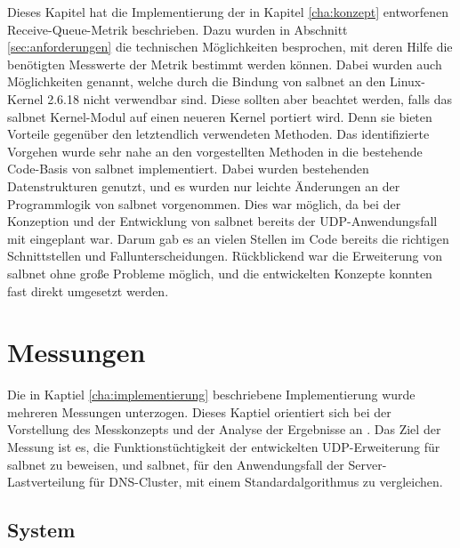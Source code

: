 \documentclass[a4paper, 12pt, BCOR10mm, DIV12, toc=bibliography, toc=listof, german]{scrbook}
\begin{document}
		Dieses Kapitel hat die Implementierung der in Kapitel \ref{cha:konzept} entworfenen Receive-Queue-Metrik
		beschrieben. Dazu wurden in Abschnitt \ref{sec:anforderungen} die technischen Möglichkeiten
		besprochen, mit deren Hilfe die benötigten Messwerte der Metrik bestimmt werden können. Dabei
		wurden auch Möglichkeiten genannt, welche durch die Bindung von salbnet an den Linux-Kernel
		2.6.18 nicht verwendbar sind. Diese sollten aber beachtet werden, falls das salbnet
		Kernel-Modul auf einen neueren Kernel portiert wird. Denn sie bieten Vorteile gegenüber
		den letztendlich verwendeten Methoden. Das identifizierte Vorgehen wurde sehr nahe an den
		vorgestellten Methoden in die bestehende Code-Basis von salbnet implementiert. Dabei wurden
		bestehenden Datenstrukturen genutzt, und es wurden nur leichte Änderungen an der Programmlogik
		von salbnet vorgenommen. Dies war möglich, da bei der Konzeption und der Entwicklung von salbnet
		bereits der UDP-Anwendungsfall mit eingeplant war. Darum gab es an vielen Stellen im Code
		bereits die richtigen Schnittstellen und Fallunterscheidungen. Rückblickend war die Erweiterung
		von salbnet ohne große Probleme möglich, und die entwickelten Konzepte konnten fast direkt
		umgesetzt werden.



	\chapter{Messungen} %
	\label{cha:messungen}

		Die in Kaptiel \ref{cha:implementierung} beschriebene Implementierung wurde mehreren Messungen
		unterzogen. Dieses Kaptiel orientiert sich bei der Vorstellung des Messkonzepts und der Analyse
		der Ergebnisse an \cite{jain1991}. Das Ziel der Messung ist es, die Funktionstüchtigkeit der
		entwickelten UDP-Erweiterung für salbnet zu beweisen, und salbnet, für den Anwendungsfall der
		Server-Lastverteilung für DNS-Cluster, mit einem Standardalgorithmus zu vergleichen.

		\section{System} %
		\label{sec:system}
\end{document}
